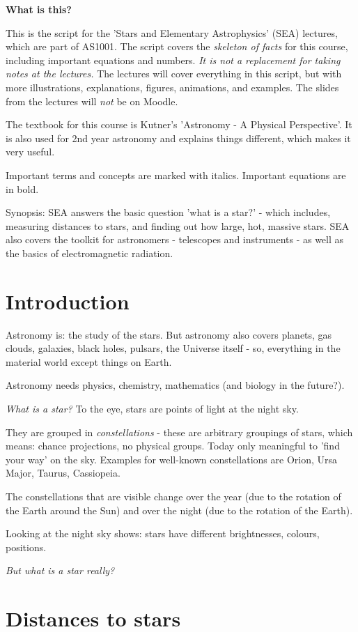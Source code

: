 \textbf{What is this?}

This is the script for the 'Stars and Elementary Astrophysics' (SEA) lectures, which are part of AS1001. The script covers the \textit{skeleton of facts} for this course, including important equations and numbers. \textit{It is not a replacement for taking notes at the lectures.} The lectures will cover everything in this script, but with more illustrations, explanations, figures, animations, and examples. The slides from the lectures will \textit{not} be on Moodle.
 
The textbook for this course is Kutner's 'Astronomy - A Physical Perspective'. It is also used for 2nd year astronomy and explains things different, which makes it very useful. 

Important terms and concepts are marked with italics. Important equations are in bold.

Synopsis: SEA answers the basic question 'what is a star?' - which includes, measuring distances to stars, and finding out how large, hot, massive stars. SEA also covers the toolkit for astronomers - telescopes and instruments - as well as the basics of electromagnetic radiation.

\section{Introduction}

Astronomy is: the study of the stars. But astronomy also covers planets, gas clouds, galaxies, black holes, pulsars, the Universe itself - so, everything in the material world except things on Earth.

Astronomy needs physics, chemistry, mathematics (and biology in the future?).

\textit{What is a star?} To the eye, stars are points of light at the night sky.

They are grouped in \textit{constellations} - these are arbitrary groupings of stars, which means: chance projections, no physical groups. Today only meaningful to 'find your way' on the sky. Examples for well-known constellations are Orion, Ursa Major, Taurus, Cassiopeia. 

The constellations that are visible change over the year (due to the rotation of the Earth around the Sun) and over the night (due to the rotation of the Earth). 

Looking at the night sky shows: stars have different brightnesses, colours, positions. 

\textit{But what is a star really?}

\section{Distances to stars}


